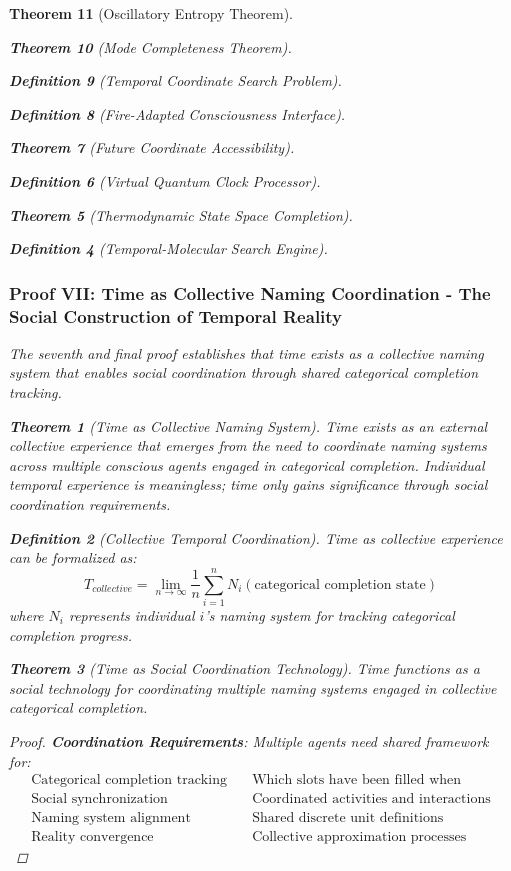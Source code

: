 \documentclass[12pt,a4paper]{article}
\newtheorem{theorem}{Theorem}[section]
\newtheorem{definition}[theorem]{Definition}
\begin{document}
\begin{theorem}[Oscillatory Entropy Theorem]
\begin{theorem}[Mode Completeness Theorem]
\begin{enumerate}
\begin{definition}[Temporal Coordinate Search Problem]
\begin{algorithm}
\begin{definition}[Fire-Adapted Consciousness Interface]
\begin{theorem}[Future Coordinate Accessibility]
\begin{definition}[Virtual Quantum Clock Processor]
\begin{itemize}
\begin{itemize}
\begin{theorem}[Thermodynamic State Space Completion]
\begin{definition}[Temporal-Molecular Search Engine]
\subsubsection{Proof VII: Time as Collective Naming Coordination - The Social Construction of Temporal Reality}

The seventh and final proof establishes that time exists as a collective naming system that enables social coordination through shared categorical completion tracking.

\begin{theorem}[Time as Collective Naming System]
Time exists as an external collective experience that emerges from the need to coordinate naming systems across multiple conscious agents engaged in categorical completion. Individual temporal experience is meaningless; time only gains significance through social coordination requirements.
\end{theorem}

\begin{definition}[Collective Temporal Coordination]
Time as collective experience can be formalized as:
$$T_{collective} = \lim_{n \to \infty} \frac{1}{n} \sum_{i=1}^{n} N_i(\text{categorical completion state})$$
where $N_i$ represents individual $i$'s naming system for tracking categorical completion progress.
\end{definition}

\begin{theorem}[Time as Social Coordination Technology]
Time functions as a social technology for coordinating multiple naming systems engaged in collective categorical completion.
\end{theorem}

\begin{proof}
\textbf{Coordination Requirements}: Multiple agents need shared framework for:
\begin{align}
\text{Categorical completion tracking} &\quad \text{Which slots have been filled when} \\
\text{Social synchronization} &\quad \text{Coordinated activities and interactions} \\
\text{Naming system alignment} &\quad \text{Shared discrete unit definitions} \\
\text{Reality convergence} &\quad \text{Collective approximation processes}
\end{align}


\end{proof}
\end{definition}
\end{theorem}
\end{itemize}
\end{itemize}
\end{definition}
\end{theorem}
\end{definition}
\end{algorithm}
\end{definition}
\end{enumerate}
\end{theorem}
\end{theorem}
\end{document}
